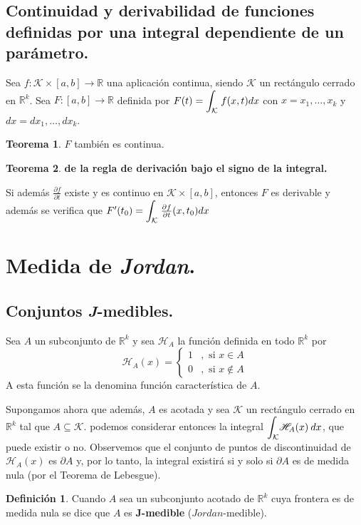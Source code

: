 \documentclass[12pt,twoside]{report}
\newcommand\mc[1]{\mathcal{#1}}
\theoremstyle{azul}
\theoremstyle{azul2}
\theoremstyle{plain}
\theoremstyle{definition}
\newtheorem{defin}{Definición}[chapter]
\newtheorem{teo}{Teorema}[chapter]
\theoremstyle{remark}
\begin{document}
\subsection{Continuidad y derivabilidad de funciones definidas por una integral dependiente de un parámetro.}
Sea $f: \mc{K} \times [a,b] \longrightarrow \mathbb{R}$ una aplicación continua, siendo $\mc{K}$ un rectángulo cerrado en $\mathbb{R}^k$. Sea $F: [a,b] \longrightarrow \mathbb{R}$ definida por $F(t)=\mathlarger{\int}_{\mc{K}} \; f(x,t)dx$ con $x=x_1, \ldots,x_k$ y $dx=dx_1, \ldots, dx_k$.
\begin{teo}
$F$ también es continua.
\end{teo}
\begin{teo}\textbf{de la regla de derivación bajo el signo de la integral.}

Si además $\frac{\partial f}{\partial t}$ existe y es continuo en $\mc{K} \times [a,b]$, entonces $F$ es derivable y además se verifica que $F'(t_0)=\mathlarger{\int}_{\mc{K}} \; \frac{\partial f}{\partial t}(x,t_0)dx $
\end{teo}



\section{Medida de \textit{Jordan}.}
\subsection{Conjuntos \textit{J}-medibles.}
Sea $A$ un subconjunto de $\mathbb{R}^k$ y sea $\mathscr{H}_A$ la función definida en todo $\mathbb{R}^k$ por 
$$\mathscr{H}_A(x)=\left\{ \begin{array}{ll}
     1 &, \text{ si } x \in A  \\
     0 &, \text{ si } x \nin A  
\end{array}\right.$$
A esta función se la denomina función característica de $A$.

Supongamos ahora que además, $A$ es acotada y sea $\mc{K}$ un rectángulo cerrado en $\mathbb{R}^k$ tal que $A \subseteq \mc{K}$. podemos considerar entonces la integral $\mathlarger{\int_{\mc{K}}}\mathscr{H}_A(x) \: dx$, que puede existir o no. Observemos que el conjunto de puntos de discontinuidad de $\mathscr{H}_A(x)$ es $\partial A$ y, por lo tanto, la integral existirá si y solo si $\partial A$ es de medida nula (por el Teorema de Lebesgue).

\begin{defin}
Cuando $A$ sea un subconjunto acotado de $\mathbb{R}^k$ cuya frontera es de medida nula se dice que $A$ es \textbf{$\boldsymbol{J}$-medible} ($Jordan$-medible). 
\end{defin}
\end{document}

